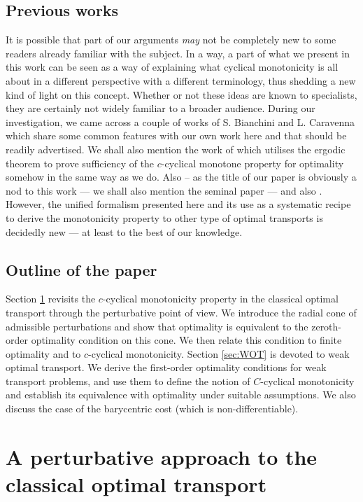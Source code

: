 \documentclass[leqno, 11pt, a4paper]{amsart}
\theoremstyle{definition}
\begin{document}
\subsection{Previous works} 
It is possible that part of our arguments \textit{may} not be completely new to some readers already familiar with the subject. In a way, a part of what we present in this work can be seen as a way of explaining what cyclical monotonicity is all about in a different perspective with a different terminology, thus shedding a new kind of light on this concept.  Whether or not these ideas are known to specialists, they are certainly not widely familiar to a broader audience. During our investigation, we came across a couple of works of S. Bianchini and L. Caravenna  \cite{bianchiniOptimalityCcyclicallyMonotone2010, bianchiniExtremalityUniquenessOptimalityb} which share some common features with our own work here and that should be readily advertised. We shall also mention the work of \textcite{beiglbockCyclicalMonotonicityErgodic2015} which utilises the ergodic theorem to prove sufficiency of the $c$-cyclical monotone property for optimality somehow in the same way as we do. Also -- as the title of our paper is obviously a nod to this work — we shall also mention the seminal paper \cite{beiglbockLandMonotonePlenty2019b} — and also \cite{zaevMongeKantorovichProblem2015}. However, the unified formalism presented here and its use as a systematic recipe to derive the monotonicity property to other type of optimal transports is  decidedly new --- at least to the best of our knowledge.

\subsection{Outline of the paper}
Section \ref{sec:OT} revisits the $c$-cyclical monotonicity property in the classical optimal transport through the perturbative point of view. We introduce the radial cone of admissible perturbations and show that optimality is equivalent to the zeroth-order optimality condition on this cone. We then relate this condition to finite optimality and to $c$-cyclical monotonicity. Section \ref{sec:WOT} is devoted to weak optimal transport. We derive the first-order optimality conditions for weak transport problems, and use them to define the notion of $C$-cyclical monotonicity and establish its equivalence with optimality under suitable assumptions. We also discuss the case of the barycentric cost (which is non-differentiable). 

\section{A perturbative approach to the classical optimal transport}\label{sec:OT}
\end{document}
